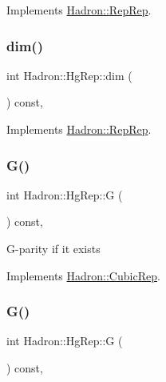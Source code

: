 Implements \mbox{\hyperlink{structHadron_1_1RepRep_a92c8802e5ed7afd7da43ccfd5b7cd92b}{Hadron\+::\+Rep\+Rep}}.

\mbox{\label{structHadron_1_1HgRep_ad951f39b175b012e73b0f66217b25032}} 
\subsubsection{\texorpdfstring{dim()}{dim()}\hspace{0.1cm}{\footnotesize\ttfamily [5/5]}}
{\footnotesize\ttfamily int Hadron\+::\+Hg\+Rep\+::dim (\begin{DoxyParamCaption}{ }\end{DoxyParamCaption}) const\hspace{0.3cm}{\ttfamily [inline]}, {\ttfamily [virtual]}}



Implements \mbox{\hyperlink{structHadron_1_1RepRep_a92c8802e5ed7afd7da43ccfd5b7cd92b}{Hadron\+::\+Rep\+Rep}}.

\mbox{\label{structHadron_1_1HgRep_a80baf377b3f2e8d633bba539efea8d04}} 
\subsubsection{\texorpdfstring{G()}{G()}\hspace{0.1cm}{\footnotesize\ttfamily [1/3]}}
{\footnotesize\ttfamily int Hadron\+::\+Hg\+Rep\+::G (\begin{DoxyParamCaption}{ }\end{DoxyParamCaption}) const\hspace{0.3cm}{\ttfamily [inline]}, {\ttfamily [virtual]}}

G-\/parity if it exists 

Implements \mbox{\hyperlink{structHadron_1_1CubicRep_a52104e43266d1614c00bbd1c3b395458}{Hadron\+::\+Cubic\+Rep}}.

\mbox{\label{structHadron_1_1HgRep_a80baf377b3f2e8d633bba539efea8d04}} 
\subsubsection{\texorpdfstring{G()}{G()}\hspace{0.1cm}{\footnotesize\ttfamily [2/3]}}
{\footnotesize\ttfamily int Hadron\+::\+Hg\+Rep\+::G (\begin{DoxyParamCaption}{ }\end{DoxyParamCaption}) const\hspace{0.3cm}{\ttfamily [inline]}, {\ttfamily [virtual]}}

